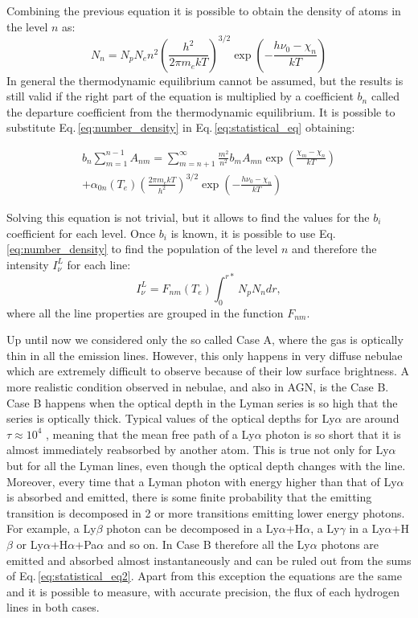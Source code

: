 \documentclass[../thesis.tex]{subfiles}
\begin{document}
Combining the previous equation it is possible to obtain the density of atoms in the level $n$ as:
\begin{equation}
    \label{eq:number_density}
    N_n = N_pN_en^2\left(\frac{h^2}{2\pi m_e k T}\right)^{3/2} \exp\left(-\frac{h\nu_0 -\chi_n}{kT}\right)
\end{equation}
In general the thermodynamic equilibrium cannot be assumed, but the results is still valid if the right part of the equation is multiplied by a coefficient $b_n$ called the departure coefficient from the thermodynamic equilibrium. It is possible to substitute Eq.\,\ref{eq:number_density} in Eq.\,\ref{eq:statistical_eq} obtaining:

\begin{multline}
    \label{eq:statistical_eq2}
    b_n \sum\limits_{m=1}^{n-1} A_{nm} = \sum\limits_{m=n+1}^{\infty} \frac{m^2}{n^2}b_m A_{mn} \exp\left(\frac{\chi_m-\chi_n}{kT}\right) \\
    + \alpha_{0n}(T_e)\left(\frac{2\pi m_e kT}{h^2}\right)^{3/2}\exp\left(-\frac{h\nu_0 - \chi_n}{kT}\right)
\end{multline}

Solving this equation is not trivial, but it allows to find the values for the $b_i$ coefficient for each level.
Once $b_i$ is known, it is possible to use Eq.\,\ref{eq:number_density} to find the population of the level $n$ and therefore the intensity $I^L_{\nu}$ for each line:
\begin{equation}
    \label{eq:emission_coef}
    I_{\nu}^L = F_{nm}(T_e)\int_0^{r*}N_pN_ndr,   
\end{equation}
where all the line properties are grouped in the function $F_{nm}$.

Up until now we considered only the so called Case A, where the gas is optically thin in all the emission lines.
However, this only happens in very diffuse nebulae which are extremely difficult to observe because of their low surface brightness.
A more realistic condition observed in nebulae, and also in AGN, is the Case B.
Case B happens when the optical depth in the Lyman series is so high that the series is optically thick.
Typical values of the optical depths for Ly$\alpha$ are around $\tau \approx 10^4$ \citep{OsterbrockAGN}, meaning that the mean free path of a Ly$\alpha$ photon is so short that it is almost immediately reabsorbed by another atom. 
This is true not only for Ly$\alpha$ but for all the Lyman lines, even though the optical depth changes with the line.
Moreover, every time that a Lyman photon with energy higher than that of Ly$\alpha$ is absorbed and emitted, there is some finite probability that the emitting transition is decomposed in 2 or more transitions emitting lower energy photons.
For example, a Ly$\beta$ photon can be decomposed in a Ly$\alpha$+H$\alpha$, a Ly$\gamma$ in a Ly$\alpha$+H$\beta$ or Ly$\alpha$+H$\alpha$+Pa$\alpha$ and so on.
In Case B therefore all the Ly$\alpha$ photons are emitted and absorbed almost instantaneously and can be ruled out from the sums of Eq.\,\ref{eq:statistical_eq2}.
Apart from this exception the equations are the same and it is possible to measure, with accurate precision, the flux of each hydrogen lines in both cases.
\end{document}
